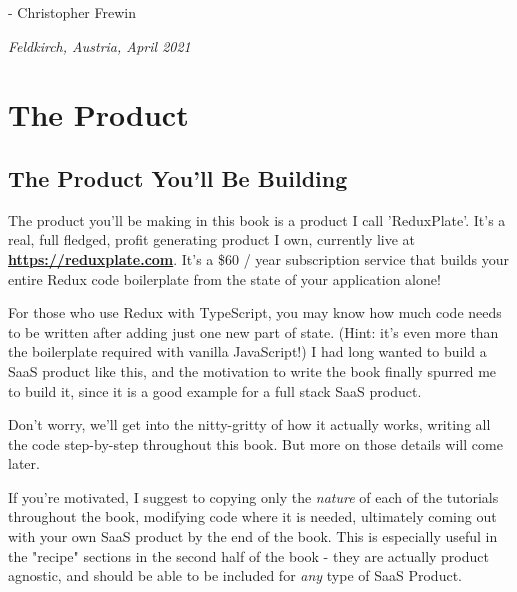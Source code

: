 \documentclass[a4paper,
                             oneside,
                             BCOR1.0cm,
                             DIV11,
                             parskip=full,
                             11pt]{scrbook}
\newcommand{\link}[2]{\textbf{\textcolor{monokaiPink}{\href{#2}{#1}}}}
\begin{document}
- Christopher Frewin

\textit{Feldkirch, Austria, April 2021}

\chapter{The Product}\label{cap:primer}

\section{The Product You'll Be Building}\label{sec:titles}

The product you'll be making in this book is a product I call 'ReduxPlate'. It's a real, full fledged, profit generating product I own, currently live at \link{https://reduxplate.com}{https://reduxplate.com}. It's a \$60 / year subscription service that builds your entire Redux code boilerplate from the state of your application alone!

For those who use Redux with TypeScript, you may know how much code needs to be written after adding just one new part of state. (Hint: it's even more than the boilerplate required with vanilla JavaScript!) I had long wanted to build a SaaS product like this, and the motivation to write the book finally spurred me to build it, since it is a good example for a full stack SaaS product. 

Don't worry, we'll get into the nitty-gritty of how it actually works, writing all the code step-by-step throughout this book. But more on those details will come later.


If you're motivated, I suggest to copying only the \textit{nature} of each of the tutorials throughout the book, modifying code where it is needed, ultimately coming out with your own SaaS product by the end of the book. This is especially useful in the "recipe" sections in the second half of the book - they are actually product agnostic, and should be able to be included for \textit{any} type of SaaS Product. 
\end{document}
